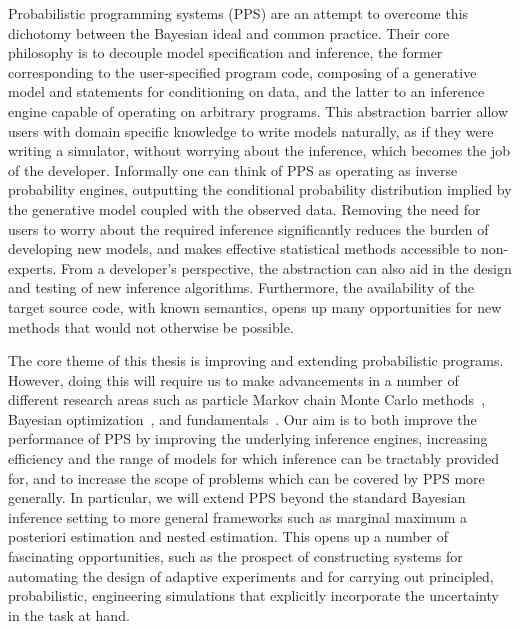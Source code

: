 
Probabilistic programming systems (PPS) \cite{carpenter2015stan,wood2014new} are an attempt to
overcome this dichotomy between the Bayesian ideal and common practice.  Their core philosophy 
is to decouple model specification and inference, the former corresponding to the user-specified 
program code, composing of a generative model and statements for conditioning on data, and the 
latter to an inference engine capable of operating on arbitrary programs.  This abstraction barrier 
allow users with domain specific knowledge to write models naturally, as if they were writing a 
simulator, without worrying about the inference, which becomes the job of the developer. Informally 
one can think of PPS as operating as inverse probability engines, outputting the conditional 
probability distribution implied by the generative model coupled with the observed data.
Removing the need for users to worry about the required inference significantly reduces the 
burden of developing new models, and makes effective statistical methods accessible to 
non-experts.  From a developer's perspective, the abstraction can also aid in the design 
and testing of new inference algorithms.  Furthermore, the availability of the target source 
code, with known semantics, opens up many opportunities for new methods that would
not otherwise be possible.

The core theme of this thesis is improving and extending probabilistic programs.  However,
doing this will require us to make advancements in a number of different research areas such
as particle Markov chain Monte Carlo methods~\citep{andrieu2010particle,rainforth2016interacting},
Bayesian optimization~\citep{movckus1975bayesian,rainforth2016bayesian}, and \mc
fundamentals~\cite{metropolis1949monte,rainforth2016pitfalls}.  Our aim is to both improve
the performance of PPS by improving the underlying inference engines, increasing
efficiency and the range of models for which inference can be tractably provided for, and to increase
the scope of problems which can be covered by PPS more generally.  In particular, we
will extend PPS beyond the standard Bayesian inference setting to more general frameworks
such as marginal maximum a posteriori estimation and nested estimation.  This opens up a number
of fascinating opportunities, such as the prospect of constructing systems for automating the
design of adaptive experiments and for carrying out principled, probabilistic, engineering simulations
that explicitly incorporate the uncertainty in the task at hand.

